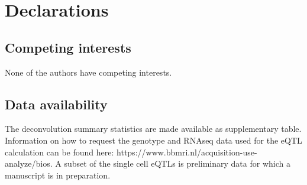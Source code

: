\section{Declarations}
\subsection{Competing interests}
None of the authors have competing interests.
\subsection{Data availability}
The deconvolution summary statistics are made available as supplementary table. Information on how to request the genotype and RNAseq data used for the eQTL calculation can be found here: https://www.bbmri.nl/acquisition-use-analyze/bios. A subset of the single cell eQTLs is preliminary data for which a manuscript is in preparation.




